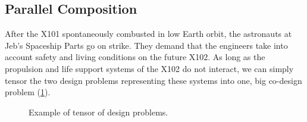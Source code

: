 
\subsection{Parallel Composition}
%
%
\begin{example}
    After the X101 spontaneously combusted in low Earth orbit, the astronauts at Jeb's Spaceship Parts go on strike.
    They demand that the engineers take into account safety and living conditions on the future X102.
    As long as the propulsion and life support systems of the X102 do not interact, we can simply tensor the two design problems representing these systems into one, big co-design problem (\cref{fig:examplemonoidal}).
    \begin{figure}[h!]
        \centering
        \caption{Example of tensor of design problems. }
        \label{fig:examplemonoidal}
    \end{figure}
\end{example}

